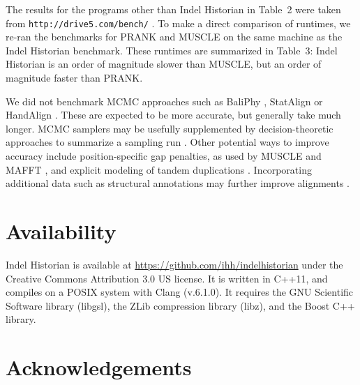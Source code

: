 \documentclass{bioinfo}
\begin{document}
The results for the programs other than Indel Historian in Table~2 were taken from {\tt http://drive5.com/bench/} \citep{Edgar2010}.
To make a direct comparison of runtimes, we re-ran the benchmarks for PRANK and MUSCLE on the same machine as the Indel Historian benchmark.
These runtimes are summarized in Table~3: Indel Historian is an order of magnitude slower than MUSCLE, but an order of magnitude faster than PRANK.

We did not benchmark MCMC approaches
such as BaliPhy \citep{Redelings2014}, StatAlign \citep{NovakEtAl2008} or HandAlign \citep{WestessonBarquistHolmes2012}.
These are expected to be more accurate, but generally take much longer.
MCMC samplers may be usefully supplemented by decision-theoretic approaches to summarize a sampling run \citep{HermanEtAl2015}.
Other potential ways to improve accuracy include position-specific gap penalties, as used by MUSCLE \citep{Edgar2004b} and MAFFT \citep{KatohEtAl2005},
and explicit modeling of tandem duplications \citep{SzalkowskiAnisimova2013}.
Incorporating additional data such as structural annotations may further improve alignments \citep{HermanEtAl2014}.

% 
% 
% 



\section{Availability}

Indel Historian is available at \url{https://github.com/ihh/indelhistorian} under the Creative Commons Attribution 3.0 US license. It is written in C++11, and compiles on a POSIX system with Clang (v.6.1.0). It requires the GNU Scientific Software library (libgsl), the ZLib compression library (libz), and the Boost C++ library.

\section*{Acknowledgements}
\end{document}
